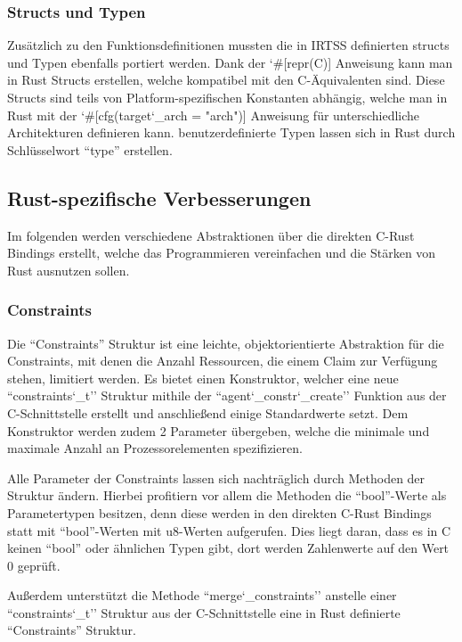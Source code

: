 \subsubsection{Structs und Typen}

Zusätzlich zu den Funktionsdefinitionen mussten die in IRTSS definierten structs und Typen ebenfalls portiert werden.
Dank der \char`#[repr(C)] Anweisung kann man in Rust Structs erstellen, welche kompatibel mit den C-Äquivalenten sind.
Diese Structs sind teils von Platform-spezifischen Konstanten abhängig, welche man in Rust mit der
\char`#[cfg(target\char`_arch = "arch")] Anweisung für unterschiedliche Architekturen definieren kann.
benutzerdefinierte Typen lassen sich in Rust durch Schlüsselwort ``type'' erstellen.

\subsection{Rust-spezifische Verbesserungen}

Im folgenden werden verschiedene Abstraktionen über die direkten C-Rust Bindings erstellt, welche das Programmieren
vereinfachen und die Stärken von Rust ausnutzen sollen.

\subsubsection{Constraints}

Die ``Constraints'' Struktur ist eine leichte, objektorientierte Abstraktion für die Constraints, mit denen die Anzahl Ressourcen, die
einem Claim zur Verfügung stehen, limitiert werden.
Es bietet einen Konstruktor, welcher eine neue ``constraints\char`_t'' Struktur mithile der ``agent\char`_constr\char`_create''
Funktion aus der C-Schnittstelle erstellt und anschließend einige Standardwerte setzt. Dem Konstruktor werden
zudem 2 Parameter übergeben, welche die minimale und maximale Anzahl an Prozessorelementen spezifizieren.

Alle Parameter der Constraints lassen sich nachträglich durch Methoden der Struktur ändern. Hierbei profitiern vor allem die Methoden
die ``bool''-Werte als Parametertypen besitzen, denn diese werden in den direkten C-Rust Bindings statt mit ``bool''-Werten mit
u8-Werten aufgerufen. Dies liegt daran, dass es in C keinen ``bool'' oder ähnlichen Typen gibt, dort werden Zahlenwerte auf den
Wert 0 geprüft.

Außerdem unterstützt die Methode ``merge\char`_constraints'' anstelle einer ``constraints\char`_t'' Struktur aus der
C-Schnittstelle eine in Rust definierte ``Constraints'' Struktur.

